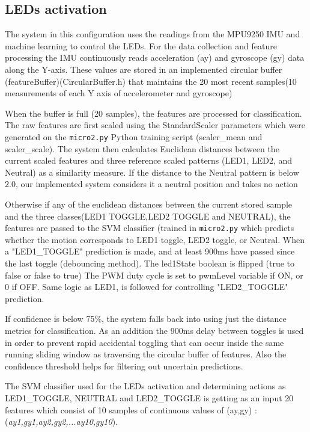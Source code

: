 \documentclass[a4paper,12pt]{article}
\begin{document}
\subsection{LEDs activation}
The system in this configuration uses the readings from the MPU9250 IMU 
and machine learning to control the LEDs. For the data collection and feature processing the IMU
continuously reads acceleration (ay) and gyroscope (gy) 
data along the Y-axis. These values are stored in an implemented circular buffer (featureBuffer)(CircularBuffer.h)
that maintains the 20 most recent samples(10 measurements of each Y axis of accelerometer and gyroscope)

When the buffer is full (20 samples), the features 
are processed for classification.
The raw features are first scaled using the StandardScaler parameters which were generated on the \texttt{micro2.py} Python training script
(scaler\_mean and scaler\_scale). The system then calculates Euclidean distances 
between the current scaled features and three reference scaled patterns (LED1, LED2, and Neutral) as a similarity measure.
If the distance to the Neutral pattern is below 2.0, our implemented system 
considers it a neutral position and takes no action

Otherwise if any of the euclidean distances between the current stored sample and the three classes(LED1 TOGGLE,LED2 TOGGLE and NEUTRAL), 
the features are passed to the SVM classifier (trained in \texttt{micro2.py} 
which predicts whether the motion corresponds to LED1 toggle, LED2 toggle, or Neutral.
When a "LED1\_TOGGLE" prediction is made, 
and at least 900ms have passed since the last toggle (debouncing method).
The led1State boolean is flipped (true to false or false to true)
The PWM duty cycle is set to pwmLevel variable if ON, or 0 if OFF.
Same logic as LED1, is followed for controlling "LED2\_TOGGLE" prediction.

If confidence is below 75\%, the system falls back 
into using just the distance metrics for classification.
As an addition the 900ms delay between toggles is used in order to prevent 
rapid accidental toggling that can occur inside the same running sliding window as
traversing the circular buffer of features.
Also the confidence threshold helps for filtering out uncertain predictions.

The SVM classifier used for the LEDs activation and determining actions as LED1\_TOGGLE, NEUTRAL and LED2\_TOGGLE
is getting as an input 20 features which consist of 10 samples of continuous values of (ay,gy) : 
\newline 
(\textit{ay1,gy1,ay2,gy2,...ay10,gy10}).
\end{document}
